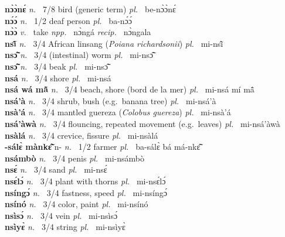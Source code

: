 {\bfseries nɔ̀ɔ̀nɛ́}  {\itshape n.~} 7/8 bird (generic term) {\itshape pl.~} be-nɔ̀ɔ̀nɛ́    \\ 
{\bfseries nɔ́ɔ́}  {\itshape n.~} 1/2 deaf person {\itshape pl.~} ba-nɔ́ɔ́    \\ 
{\bfseries nɔ̀ɔ̀}  {\itshape v.~} take   {\itshape npp.~} nɔ̀ngá {\itshape recip.~} nɔ̀ngala  \\ 
{\bfseries nsĩ̂}  {\itshape n.~} 3/4 African linsang ({\itshape Poiana richardsonii}) {\itshape pl.~} mi-nsĩ̂    \\ 
{\bfseries nsɔ̃̂}  {\itshape n.~} 3/4 (intestinal) worm {\itshape pl.~} mi-nsɔ̃̂    \\ 
{\bfseries nsɔ̃̂}  {\itshape n.~} 3/4 beak {\itshape pl.~} mi-nsɔ̃̂    \\ 
{\bfseries nsá}  {\itshape n.~} 3/4 shore {\itshape pl.~} mi-nsá    \\ 
{\bfseries nsá wá mã̂}  {\itshape n.~} 3/4 beach, shore (bord de la mer) {\itshape pl.~} mi-nsá mí mã̂    \\ 
{\bfseries nsá'à}  {\itshape n.~} 3/4 shrub, bush (e.g.\ banana tree) {\itshape pl.~} mi-nsá'à    \\ 
{\bfseries nsà'á}  {\itshape n.~} 3/4 mantled guereza ({\itshape Colobus guereza})  {\itshape pl.~} mi-nsà'á    \\ 
{\bfseries nsá'àwà}  {\itshape n.~} 3/4 flouncing, repeated movement (e.g.\ leaves) {\itshape pl.~} mi-nsá'àwà    \\ 
{\bfseries nsàlá}  {\itshape n.~} 3/4 crevice, fissure {\itshape pl.~} mi-nsàlá    \\ 
{\bfseries -sálɛ̀ mànkɛ̃̂} n- {\itshape n.~} 1/2 farmer {\itshape pl.~} ba-sálɛ̀ bá má-nkɛ̃̂    \\ 
{\bfseries nsámbò}  {\itshape n.~} 3/4 penis {\itshape pl.~} mi-nsámbò    \\ 
{\bfseries nsɛ́}  {\itshape n.~} 3/4 sand {\itshape pl.~} mi-nsɛ́    \\ 
{\bfseries nsɛ́lɔ́}  {\itshape n.~} 3/4 plant with thorns {\itshape pl.~} mi-nsɛ́lɔ́    \\ 
{\bfseries nsíngɔ́}  {\itshape n.~} 3/4 fastness, speed {\itshape pl.~} mi-nsíngɔ́    \\ 
{\bfseries nsínó}  {\itshape n.~} 3/4 color, paint {\itshape pl.~} mi-nsínó    \\ 
{\bfseries nsìsɔ́}  {\itshape n.~} 3/4 vein {\itshape pl.~} mi-nsìsɔ́    \\ 
{\bfseries nsìyɛ̀}  {\itshape n.~} 3/4 string {\itshape pl.~} mi-nsìyɛ̀    \\ 
